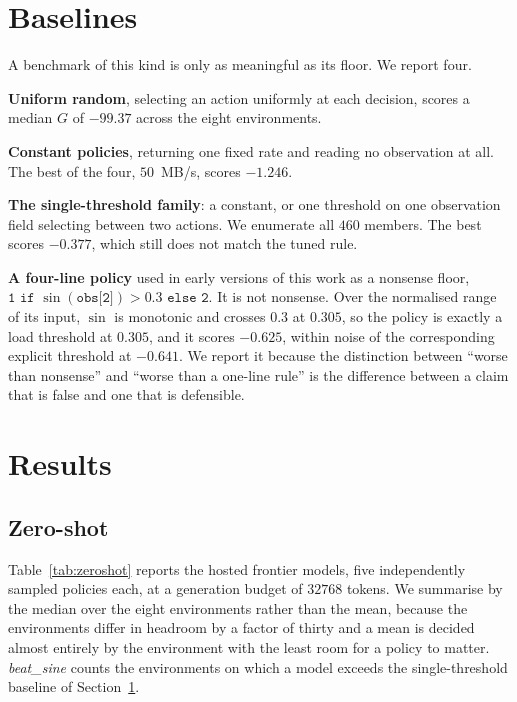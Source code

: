 \documentclass[conference]{IEEEtran}
\newcommand{\G}{\ensuremath{G}}
\begin{document}
\section{Baselines}
\label{sec:baselines}

A benchmark of this kind is only as meaningful as its floor. We report four.

\textbf{Uniform random}, selecting an action uniformly at each decision, scores a median
$\G$ of $-99.37$ across the eight environments.

\textbf{Constant policies}, returning one fixed rate and reading no observation at all.
The best of the four, $50$~MB/s, scores $-1.246$.

\textbf{The single-threshold family}: a constant, or one threshold on one observation
field selecting between two actions. We enumerate all $460$ members. The best scores
$-0.377$, which still does not match the tuned rule.

\textbf{A four-line policy} used in early versions of this work as a nonsense floor,
$\texttt{1 if } \sin(\texttt{obs[2]}) > 0.3 \texttt{ else 2}$. It is not nonsense.
Over the normalised range of its input, $\sin$ is monotonic and crosses $0.3$ at $0.305$,
so the policy is exactly a load threshold at $0.305$, and it scores $-0.625$, within noise
of the corresponding explicit threshold at $-0.641$. We report it because the distinction
between ``worse than nonsense'' and ``worse than a one-line rule'' is the difference
between a claim that is false and one that is defensible.

\section{Results}

\subsection{Zero-shot}

Table~\ref{tab:zeroshot} reports the hosted frontier models, five independently sampled
policies each, at a generation budget of $32768$ tokens. We summarise by the median over
the eight environments rather than the mean, because the environments differ in headroom
by a factor of thirty and a mean is decided almost entirely by the environment with the
least room for a policy to matter. \emph{beat\_sine} counts the environments on which a
model exceeds the single-threshold baseline of Section~\ref{sec:baselines}.
\end{document}
